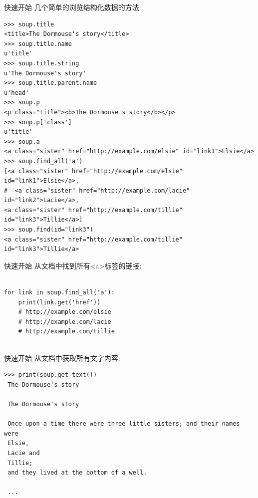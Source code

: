 \documentclass{beamer}
\begin{document}
\begin{frame}[t,fragile]{快速开始}
几个简单的浏览结构化数据的方法:

\scriptsize
\begin{verbatim}
>>> soup.title
<title>The Dormouse's story</title>
>>> soup.title.name
u'title'
>>> soup.title.string
u'The Dormouse's story'
>>> soup.title.parent.name
u'head'
>>> soup.p
<p class="title"><b>The Dormouse's story</b></p>
>>> soup.p['class']
u'title'
>>> soup.a
<a class="sister" href="http://example.com/elsie" id="link1">Elsie</a>
>>> soup.find_all('a')
[<a class="sister" href="http://example.com/elsie" id="link1">Elsie</a>,
#  <a class="sister" href="http://example.com/lacie" id="link2">Lacie</a>,
<a class="sister" href="http://example.com/tillie" id="link3">Tillie</a>]
>>> soup.find(id="link3")
<a class="sister" href="http://example.com/tillie" id="link3">Tillie</a>
\end{verbatim}


\end{frame}

\begin{frame}[t,fragile]{快速开始}
从文档中找到所有<a>标签的链接:
\begin{verbatim}

for link in soup.find_all('a'):
    print(link.get('href'))
    # http://example.com/elsie
    # http://example.com/lacie
    # http://example.com/tillie


\end{verbatim}


\end{frame}


\begin{frame}[t,fragile]{快速开始}
从文档中获取所有文字内容:
\begin{verbatim}
>>> print(soup.get_text())
 The Dormouse's story

 The Dormouse's story

 Once upon a time there were three little sisters; and their names were
 Elsie,
 Lacie and
 Tillie;
 and they lived at the bottom of a well.

 ...
\end{verbatim}
\end{frame}
\end{document}
